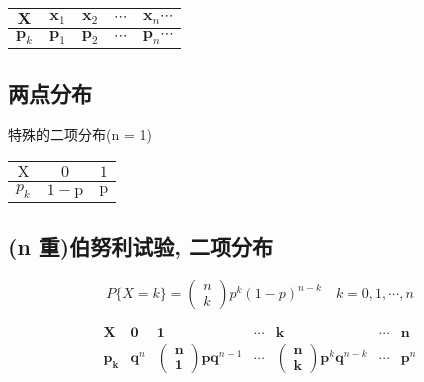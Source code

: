 \begin{center}
    \begin{tabular}{|c|c|c|c|c|}
    \hline $ \boldsymbol{X} $ & $ \boldsymbol{x}_{1} $ & $ \boldsymbol{x}_{2} $ & $ \cdots $ & $ \boldsymbol{x}_{n} \cdots $ \\
    \hline $ \boldsymbol{p}_{k} $ & $ \boldsymbol{p}_{1} $ & $ \boldsymbol{p}_{2} $ & $ \cdots $ & $ \boldsymbol{p}_{n} \cdots $ \\
    \hline
    \end{tabular}
\end{center}


\subsection{两点分布}

特殊的二项分布(n = 1)
\begin{center}
   \begin{tabular}{|c|c|c|}
    \hline $ \mathrm{X} $ & $0$ & $1 $\\
    \hline$ p_{k} $ & $ 1-\mathrm{p} $ & $ \mathrm{p} $ \\
    \hline
    \end{tabular}

\subsection{(n 重)伯努利试验, 二项分布} 
\end{center}


$$
P\{X=k\}=\left(\begin{array}{l}
n \\
k
\end{array}\right) p^{k}(1-p)^{n-k} \quad k=0,1, \cdots, n
$$

$$
\begin{array}{c|cccccc}
\boldsymbol{X} & \mathbf{0} & \mathbf{1} & \cdots & \boldsymbol{k} & \cdots & \boldsymbol{n} \\
\hline \boldsymbol{p}_{\boldsymbol{k}} & \boldsymbol{q}^{n} & \left(\begin{array}{l}
\boldsymbol{n} \\
\mathbf{1}
\end{array}\right) \boldsymbol{p q}^{n-1} & \cdots & \left(\begin{array}{l}
\boldsymbol{n} \\
\boldsymbol{k}
\end{array}\right) \boldsymbol{p}^{k} \boldsymbol{q}^{n-k} & \cdots & \boldsymbol{p}^{n}
\end{array}
$$

